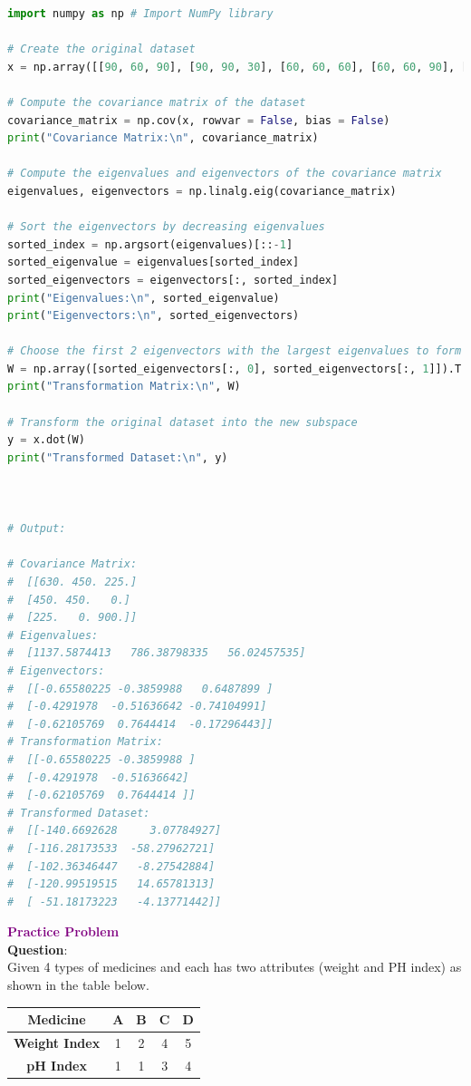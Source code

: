 \documentclass{book}
\begin{document}
\begin{lstlisting}[language=Python, basicstyle=\ttfamily\small, keywordstyle=\color{blue}, commentstyle=\color{forestgreen}, stringstyle=\color{red}, showstringspaces=false]
import numpy as np # Import NumPy library

# Create the original dataset
x = np.array([[90, 60, 90], [90, 90, 30], [60, 60, 60], [60, 60, 90], [30, 30, 30]])

# Compute the covariance matrix of the dataset
covariance_matrix = np.cov(x, rowvar = False, bias = False) 
print("Covariance Matrix:\n", covariance_matrix)

# Compute the eigenvalues and eigenvectors of the covariance matrix
eigenvalues, eigenvectors = np.linalg.eig(covariance_matrix) 

# Sort the eigenvectors by decreasing eigenvalues
sorted_index = np.argsort(eigenvalues)[::-1]
sorted_eigenvalue = eigenvalues[sorted_index]
sorted_eigenvectors = eigenvectors[:, sorted_index]
print("Eigenvalues:\n", sorted_eigenvalue)
print("Eigenvectors:\n", sorted_eigenvectors)

# Choose the first 2 eigenvectors with the largest eigenvalues to form a 3x2 transformation matrix
W = np.array([sorted_eigenvectors[:, 0], sorted_eigenvectors[:, 1]]).T
print("Transformation Matrix:\n", W)

# Transform the original dataset into the new subspace
y = x.dot(W)
print("Transformed Dataset:\n", y)



# Output:

# Covariance Matrix:
#  [[630. 450. 225.]
#  [450. 450.   0.]
#  [225.   0. 900.]]
# Eigenvalues:
#  [1137.5874413   786.38798335   56.02457535]
# Eigenvectors:
#  [[-0.65580225 -0.3859988   0.6487899 ]
#  [-0.4291978  -0.51636642 -0.74104991]
#  [-0.62105769  0.7644414  -0.17296443]]
# Transformation Matrix:
#  [[-0.65580225 -0.3859988 ]
#  [-0.4291978  -0.51636642]
#  [-0.62105769  0.7644414 ]]
# Transformed Dataset:
#  [[-140.6692628     3.07784927]
#  [-116.28173533  -58.27962721]
#  [-102.36346447   -8.27542884]
#  [-120.99519515   14.65781313]
#  [ -51.18173223   -4.13771442]]
\end{lstlisting}
\newpage
\textbf{\textcolor{purple}{\Large{Practice Problem}}}\\
\textbf{Question}:\\
Given 4 types of medicines and each has two attributes (weight and PH index) as shown in the table below.\\
\begin{center}
    \begin{tabular}{|c|c|c|c|c|}
        \hline
        \rowcolor{lightblue}
        \textbf{Medicine} & \textbf{A} & \textbf{B} & \textbf{C} & \textbf{D}\\
        \hline
        \textbf{Weight Index} & 1 & 2 & 4 & 5 \\
        \hline
        \textbf{pH Index} & 1 & 1 & 3 & 4 \\
        \hline
    \end{tabular}
\end{center} 
\end{document}
